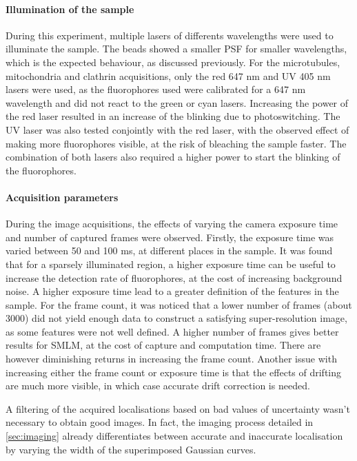 \paragraph{Illumination of the sample}
During this experiment, multiple lasers of differents wavelengths were used to illuminate the sample. The beads showed a smaller PSF for smaller wavelengths, which is the expected behaviour, as discussed previously. For the microtubules, mitochondria and clathrin acquisitions, only the red 647 nm and UV 405 nm lasers were used, as the fluorophores used were calibrated for a 647 nm wavelength and did not react to the green or cyan lasers. Increasing the power of the red laser resulted in an increase of the blinking due to photoswitching. The UV laser was also tested conjointly with the red laser, with the observed effect of making more fluorophores visible, at the risk of bleaching the sample faster. The combination of both lasers also required a higher power to start the blinking of the fluorophores.

\paragraph{Acquisition parameters}
During the image acquisitions, the effects of varying the camera exposure time and number of captured frames were observed. Firstly, the exposure time was varied between 50 and 100 ms, at different places in the sample. It was found that for a sparsely illuminated region, a higher exposure time can be useful to increase the detection rate of fluorophores, at the cost of increasing background noise. A higher exposure time lead to a greater definition of the features in the sample. For the frame count, it was noticed that a lower number of frames (about 3000) did not yield enough data to construct a satisfying super-resolution image, as some features were not well defined. A higher number of frames gives better results for SMLM, at the cost of capture and computation time. There are however diminishing returns in increasing the frame count. Another issue with increasing either the frame count or exposure time is that the effects of drifting are much more visible, in which case accurate drift correction is needed.

A filtering of the acquired localisations based on bad values of uncertainty wasn't necessary to obtain good images.
In fact, the imaging process detailed in \autoref{sec:imaging} already differentiates between accurate and inaccurate localisation by varying the width of the superimposed Gaussian curves.

